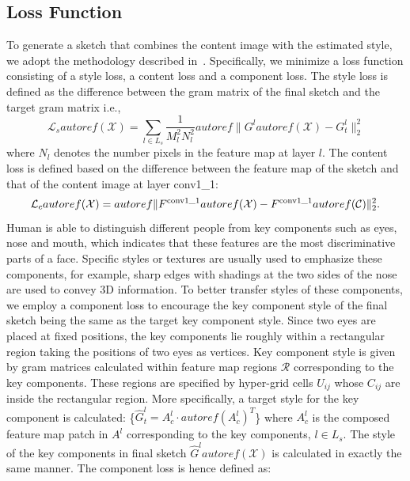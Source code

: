 \documentclass[10pt,twocolumn,letterpaper]{article}
\begin{document}
{
\subsection{Loss Function}
}
To generate a sketch that combines the content image with the estimated style, we adopt the methodology described in~\cite{gatys2015texture}. Specifically, we minimize a loss function consisting of a style loss, a content loss and a component loss. The style loss is defined as the difference between the gram matrix of the final sketch and the target gram matrix i.e.,
\begin{equation}
\mathcal{L}_{s} autoref( \mathcal{X} ) = \sum\limits_{l \in {L_s}} {\frac{1}{{M_l^2N_l^2}}autoref\| {{G^l}autoref( \mathcal{X} ) - G_t^l} \|_2^2} 
\label{eq:Gram_loss}
\end{equation}
where $N_l$ denotes the number pixels in the feature map at layer $l$. The content loss is defined based on the difference between the feature map of the sketch and that of the content image at layer conv1\_1:
\begin{equation}
\mathcal{L}_{c}autoref( \mathcal{X} ) = autoref\| {{F^{\rm{conv1\_1}}}autoref( \mathcal{X} ) - {F^{\rm{conv1\_1}}}autoref( \mathcal{C} )} \|_2^2.
\label{eq:Style_loss}
\end{equation}
Human is able to distinguish different people from key components such as eyes, nose and mouth, which indicates that these features are the most discriminative parts of a face. Specific styles or textures are usually used to emphasize these components, for example, sharp edges with shadings at the two sides of the nose are used to convey 3D information. To better transfer styles of these components, we employ a component loss to encourage the key component style of the final sketch being the same as the target key component style. Since two eyes are placed at fixed positions, the key components lie roughly within a rectangular region taking the positions of two eyes as vertices. Key component style is given by gram matrices calculated within feature map regions $\mathcal R$ corresponding to the key components. These regions are specified by hyper-grid cells $U_{ij}$ whose $C_{ij}$ are inside the rectangular region. More specifically, a target style for the key component is calculated: \{${\hat G}_{t}^l ={A}_{c}^l \cdot {autoref( {{{A}_{c}^l}} )^T}$\} where ${A}_{c}^l$ is the composed feature map patch in $A^{l}$ corresponding to the key components, $l\in L_s$. The style of the key components in final sketch ${\hat G}^lautoref( \mathcal{X} ) $ is calculated in exactly the same manner. The component loss is hence defined as:
\end{document}
